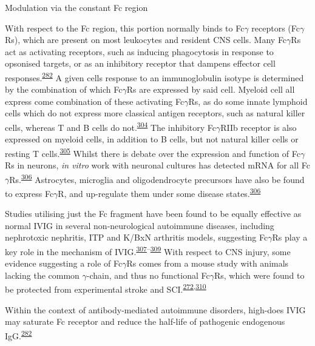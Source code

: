 \documentclass[
]{article}
\begin{document}
Modulation via the constant Fc region

With respect to the Fc region, this portion normally binds to Fc\(\gamma\) receptors (Fc\(\gamma\)Rs), which are present on most leukocytes and resident CNS cells.
Many Fc\(\gamma\)Rs act as activating receptors, such as inducing phagocytosis in response to opsonised targets, or as an inhibitory receptor that dampens effector cell responses.\textsuperscript{\protect\hyperlink{ref-schwab_intravenous_2013}{282}}
A given cells response to an immunoglobulin isotype is determined by the combination of which Fc\(\gamma\)Rs are expressed by said cell.
Myeloid cell all express come combination of these activating Fc\(\gamma\)Rs, as do some innate lymphoid cells which do not express more classical antigen receptors, such as natural killer cells, whereas T and B cells do not.\textsuperscript{\protect\hyperlink{ref-perussia_murine_1989}{304}}
The inhibitory Fc\(\gamma\)RIIb receptor is also expressed on myeloid cells, in addition to B cells, but not natural killer cells or resting T cells.\textsuperscript{\protect\hyperlink{ref-bruhns_mouse_2015}{305}}
Whilst there is debate over the expression and function of Fc\(\gamma\)Rs in neurons, \emph{in vitro} work with neuronal cultures has detected mRNA for all Fc\(\gamma\)Rs.\textsuperscript{\protect\hyperlink{ref-thom_therapeutic_2017}{306}}
Astrocytes, microglia and oligodendrocyte precursors have also be found to express Fc\(\gamma\)R, and up-regulate them under some disease states.\textsuperscript{\protect\hyperlink{ref-thom_therapeutic_2017}{306}}

Studies utilising just the Fc fragment have been found to be equally effective as normal IVIG in several non-neurological autoimmune diseases, including nephrotoxic nephritis, ITP and K/BxN arthritis models, suggesting Fc\(\gamma\)Rs play a key role in the mechanism of IVIG.\textsuperscript{\protect\hyperlink{ref-samuelsson_anti-inflammatory_2001}{307}--\protect\hyperlink{ref-kaneko_pathology_2006}{309}}
With respect to CNS injury, some evidence suggesting a role of Fc\(\gamma\)Rs comes from a mouse study with animals lacking the common \(\gamma\)-chain, and thus no functional Fc\(\gamma\)Rs, which were found to be protected from experimental stroke and SCI.\textsuperscript{\protect\hyperlink{ref-ankeny_b_2009}{272},\protect\hyperlink{ref-komine-kobayashi_dual_2004}{310}}

Within the context of antibody-mediated autoimmune disorders, high-does IVIG may saturate Fc receptor and reduce the half-life of pathogenic endogenous IgG.\textsuperscript{\protect\hyperlink{ref-schwab_intravenous_2013}{282}}
\end{document}
